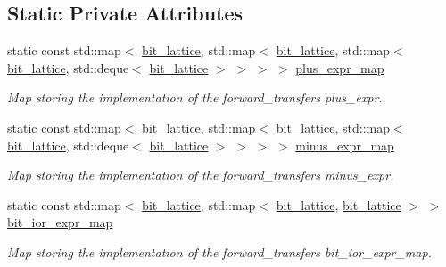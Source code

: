 \subsection*{Static Private Attributes}
\begin{DoxyCompactItemize}
\item 
static const std\+::map$<$ \hyperlink{bit__lattice_8hpp_ab732360111c810c4eaeb4c8b81d160d6}{bit\+\_\+lattice}, std\+::map$<$ \hyperlink{bit__lattice_8hpp_ab732360111c810c4eaeb4c8b81d160d6}{bit\+\_\+lattice}, std\+::map$<$ \hyperlink{bit__lattice_8hpp_ab732360111c810c4eaeb4c8b81d160d6}{bit\+\_\+lattice}, std\+::deque$<$ \hyperlink{bit__lattice_8hpp_ab732360111c810c4eaeb4c8b81d160d6}{bit\+\_\+lattice} $>$ $>$ $>$ $>$ \hyperlink{classBit__Value_a60afcc57dc9bc4992577b81eb752c396}{plus\+\_\+expr\+\_\+map}
\begin{DoxyCompactList}\small\item\em Map storing the implementation of the forward\+\_\+transfer\textquotesingle{}s plus\+\_\+expr. \end{DoxyCompactList}\item 
static const std\+::map$<$ \hyperlink{bit__lattice_8hpp_ab732360111c810c4eaeb4c8b81d160d6}{bit\+\_\+lattice}, std\+::map$<$ \hyperlink{bit__lattice_8hpp_ab732360111c810c4eaeb4c8b81d160d6}{bit\+\_\+lattice}, std\+::map$<$ \hyperlink{bit__lattice_8hpp_ab732360111c810c4eaeb4c8b81d160d6}{bit\+\_\+lattice}, std\+::deque$<$ \hyperlink{bit__lattice_8hpp_ab732360111c810c4eaeb4c8b81d160d6}{bit\+\_\+lattice} $>$ $>$ $>$ $>$ \hyperlink{classBit__Value_a14e017ca4c0bf5fd112f293bd7d1af3b}{minus\+\_\+expr\+\_\+map}
\begin{DoxyCompactList}\small\item\em Map storing the implementation of the forward\+\_\+transfer\textquotesingle{}s minus\+\_\+expr. \end{DoxyCompactList}\item 
static const std\+::map$<$ \hyperlink{bit__lattice_8hpp_ab732360111c810c4eaeb4c8b81d160d6}{bit\+\_\+lattice}, std\+::map$<$ \hyperlink{bit__lattice_8hpp_ab732360111c810c4eaeb4c8b81d160d6}{bit\+\_\+lattice}, \hyperlink{bit__lattice_8hpp_ab732360111c810c4eaeb4c8b81d160d6}{bit\+\_\+lattice} $>$ $>$ \hyperlink{classBit__Value_a64fd76ea6cbb0dccb62dd90302d5122d}{bit\+\_\+ior\+\_\+expr\+\_\+map}
\begin{DoxyCompactList}\small\item\em Map storing the implementation of the forward\+\_\+transfer\textquotesingle{}s bit\+\_\+ior\+\_\+expr\+\_\+map. \end{DoxyCompactList}\item 

\end{DoxyCompactItemize}

